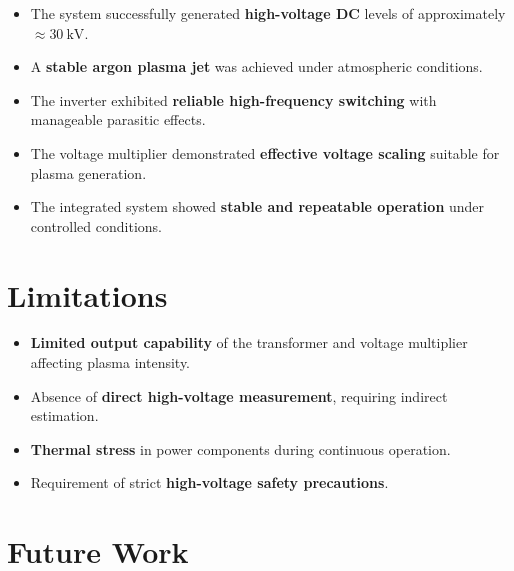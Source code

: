 \begin{itemize}
    \item The system successfully generated \textbf{high-voltage DC} levels of approximately \(\approx 30~\text{kV}\).
    
    \item A \textbf{stable argon plasma jet} was achieved under atmospheric conditions.
    
    \item The inverter exhibited \textbf{reliable high-frequency switching} with manageable parasitic effects.
    
    \item The voltage multiplier demonstrated \textbf{effective voltage scaling} suitable for plasma generation.
    
    \item The integrated system showed \textbf{stable and repeatable operation} under controlled conditions.
\end{itemize}

\vspace{0.3cm}


\section{Limitations}

\begin{itemize}
    
    \item \textbf{Limited output capability} of the transformer and voltage multiplier affecting plasma intensity.
    
    \item Absence of \textbf{direct high-voltage measurement}, requiring indirect estimation.
    
    \item \textbf{Thermal stress} in power components during continuous operation.
    
    \item Requirement of strict \textbf{high-voltage safety precautions}.
\end{itemize}

\vspace{0.3cm}

\section{Future Work}

